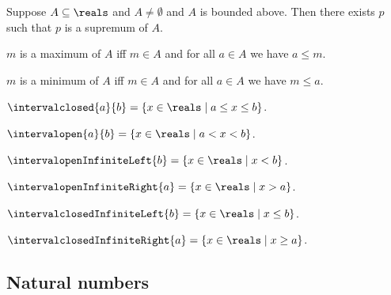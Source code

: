 \begin{axiom}\label{real_completeness_axiom}
    Suppose $A\subseteq\reals$ and $A\neq \emptyset$ and $A$ is bounded above.
    Then there exists $p$ such that $p$ is a supremum of $A$.
\end{axiom}

\begin{definition}\label{real_maximum}
    $m$ is a maximum of $A$ iff $m\in A$ and for all $a\in A$ we have $a \leq m$.
\end{definition}

\begin{definition}\label{real_minimum}
    $m$ is a minimum of $A$ iff $m\in A$ and for all $a\in A$ we have $m \leq a$.
\end{definition}

\begin{definition}\label{intervalclosed}
    $\intervalclosed{a}{b} = \{x \in \reals \mid a \leq x \leq b\}$.
\end{definition}

\begin{definition}\label{intervalopen}
    $\intervalopen{a}{b} = \{ x \in \reals \mid a < x < b\}$.
\end{definition}

\begin{definition}\label{intervalopen_infinite_left}
    $\intervalopenInfiniteLeft{b} = \{ x \in \reals \mid x < b\}$.
\end{definition}

\begin{definition}\label{intervalopen_infinite_right}
    $\intervalopenInfiniteRight{a} = \{ x \in \reals \mid x > a\}$.
\end{definition}

\begin{definition}\label{intervalclosed_infinite_left}
    $\intervalclosedInfiniteLeft{b} = \{ x \in \reals \mid x \leq b\}$.
\end{definition}

\begin{definition}\label{intervalclosed_infinite_right}
    $\intervalclosedInfiniteRight{a} = \{ x \in \reals \mid x \geq a\}$.
\end{definition}

\subsection{Natural numbers}

